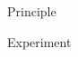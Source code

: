 \documentclass[10pt]{beamer}
\begin{document}
\begin{frame}{Principle}

	

\end{frame}

\begin{frame}{Experiment}

	

\end{frame}
\end{document}
